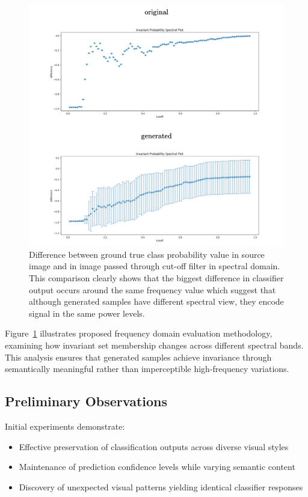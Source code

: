 \begin{figure}[h]
\centering
\includegraphics[width=\linewidth]{figures/main/spectral_analysis_2.png}
\caption{Difference between ground true class probability value in source image and in image passed through cut-off filter in spectral domain. This comparison clearly shows that the biggest difference in classifier output occurs around the same frequency value which suggest that although generated samples have different spectral view, they encode signal in the same power levels.}
\label{fig:frequency_analysis_2}
\end{figure}

Figure~\ref{fig:frequency_analysis_2} illustrates proposed frequency domain evaluation methodology, examining how invariant set membership changes across different spectral bands. This analysis ensures that generated samples achieve invariance through semantically meaningful rather than imperceptible high-frequency variations.

\subsection{Preliminary Observations}

Initial experiments demonstrate:
\begin{itemize}
\item Effective preservation of classification outputs across diverse visual styles
\item Maintenance of prediction confidence levels while varying semantic content  
\item Discovery of unexpected visual patterns yielding identical classifier responses
\end{itemize}

